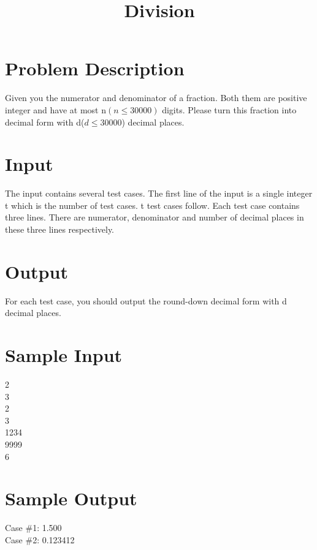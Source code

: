 \documentclass[12pt]{article}
\title{Division}
\begin{document}
\date{}
\maketitle
\section*{Problem Description}
Given you the numerator and denominator of a fraction. Both them are positive integer and have at most n$(n \leq 30000)$ digits.
Please turn this fraction into decimal form with d($d \leq 30000$) decimal places.
\section*{Input}
The input contains several test cases. The first line of the input is a single integer t which is the number of test cases. t test cases follow.
Each test case contains three lines. There are numerator, denominator and number of decimal places in these three lines respectively.
\section*{Output}
For each test case, you should output the round-down decimal form with d decimal places. 
\section*{Sample Input}
2\\
3\\
2\\
3\\
1234\\
9999\\
6\\
\section*{Sample Output}
Case \#1: 1.500\\
Case \#2: 0.123412\\		
\end{document}
